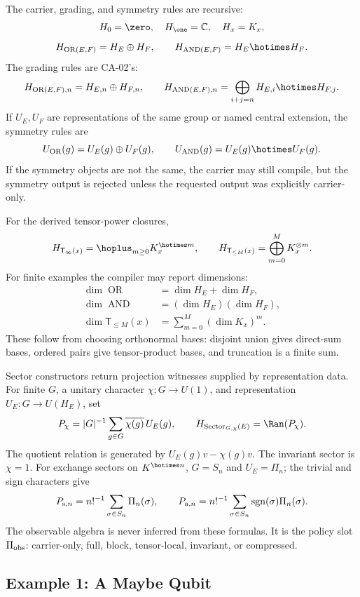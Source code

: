 The carrier, grading, and symmetry rules are recursive:
\[
H_0=\zero,\quad H_{\one}=\mathbb C,\quad H_x=K_x,
\]
\[
H_{\operatorname{OR}(E,F)}=H_E\oplus H_F,\qquad
H_{\operatorname{AND}(E,F)}=H_E\hotimes H_F.
\]
The grading rules are CA-02's:
\[
H_{\operatorname{OR}(E,F),n}=H_{E,n}\oplus H_{F,n},\qquad
H_{\operatorname{AND}(E,F),n}=\bigoplus_{i+j=n}H_{E,i}\hotimes H_{F,j}.
\]
If \(U_E,U_F\) are representations of the same group or named central
extension, the symmetry rules are
\[
U_{\operatorname{OR}}(g)=U_E(g)\oplus U_F(g),\qquad
U_{\operatorname{AND}}(g)=U_E(g)\hotimes U_F(g).
\]
If the symmetry objects are not the same, the carrier may still compile, but the
symmetry output is rejected unless the requested output was explicitly
carrier-only.

For the derived tensor-power closures,
\[
H_{\mathsf T_{\infty}(x)}=\hoplus_{m\ge0}K_x^{\hotimes m},\qquad
H_{\mathsf T_{\le M}(x)}=\bigoplus_{m=0}^{M}K_x^{\otimes m}.
\]
For finite examples the compiler may report dimensions:
\[
\begin{aligned}
\dim\operatorname{OR} &= \dim H_E+\dim H_F,\\
\dim\operatorname{AND} &= (\dim H_E)(\dim H_F),\\
\dim\mathsf T_{\le M}(x) &= \sum_{m=0}^{M}(\dim K_x)^m .
\end{aligned}
\]
These follow from choosing orthonormal bases: disjoint union gives direct-sum
bases, ordered pairs give tensor-product bases, and truncation is a finite sum.

Sector constructors return projection witnesses supplied by representation data.
For finite \(G\), a unitary character \(\chi:G\to U(1)\), and representation
\(U_E:G\to U(H_E)\), set
\[
P_{\chi}=|G|^{-1}\sum_{g\in G}\overline{\chi(g)}\,U_E(g),\qquad
H_{\operatorname{Sector}_{G,\chi}(E)}=\Ran(P_{\chi}).
\]
The quotient relation is generated by \(U_E(g)v-\chi(g)v\).  The invariant
sector is \(\chi=1\).  For exchange sectors on \(K^{\hotimes n}\), \(G=S_n\) and
\(U_E=\Pi_n\); the trivial and sign characters give
\[
P_{{\rm s},n}=n!^{-1}\sum_{\sigma\in S_n}\Pi_n(\sigma),\qquad
P_{{\rm a},n}=n!^{-1}\sum_{\sigma\in S_n}\operatorname{sgn}(\sigma)\Pi_n(\sigma).
\]
The observable algebra is never inferred from these formulas.  It is the policy
slot \(\Pi_{\rm obs}\): carrier-only, full, block, tensor-local, invariant, or compressed.

\subsection{Example 1: A Maybe Qubit}

